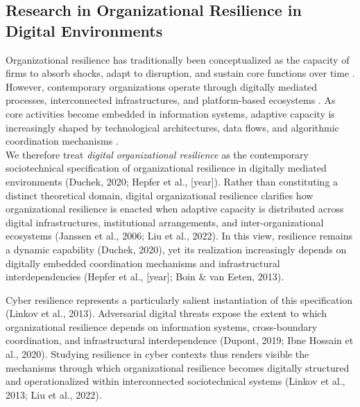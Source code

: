 \subsection{Research in Organizational Resilience in Digital Environments}

Organizational resilience has traditionally been conceptualized as the capacity of firms to absorb shocks, adapt to disruption, and sustain core functions over time \autocite{duchek2020organizational,burnard2011organisational}. However, contemporary organizations operate through digitally mediated processes, interconnected infrastructures, and platform-based ecosystems \autocite{hepfer2022heterogeneity, janssen2006network}. As core activities become embedded in information systems, adaptive capacity is increasingly shaped by technological architectures, data flows, and algorithmic coordination mechanisms \autocite{hepfer2022heterogeneity,liu2022network}.\\

We therefore treat \emph{digital organizational resilience} as the contemporary sociotechnical specification of organizational resilience in digitally mediated environments (Duchek, 2020; Hepfer et al., [year]). Rather than constituting a distinct theoretical domain, digital organizational resilience clarifies how organizational resilience is enacted when adaptive capacity is distributed across digital infrastructures, institutional arrangements, and inter-organizational ecosystems (Janssen et al., 2006; Liu et al., 2022). In this view, resilience remains a dynamic capability (Duchek, 2020), yet its realization increasingly depends on digitally embedded coordination mechanisms and infrastructural interdependencies (Hepfer et al., [year]; Boin \& van Eeten, 2013).

Cyber resilience represents a particularly salient instantiation of this specification (Linkov et al., 2013). Adversarial digital threats expose the extent to which organizational resilience depends on information systems, cross-boundary coordination, and infrastructural interdependence (Dupont, 2019; Ibne Hossain et al., 2020). Studying resilience in cyber contexts thus renders visible the mechanisms through which organizational resilience becomes digitally structured and operationalized within interconnected sociotechnical systems (Linkov et al., 2013; Liu et al., 2022).

